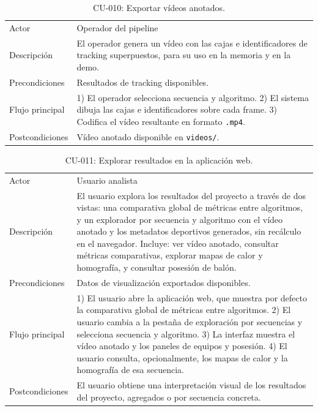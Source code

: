 \begin{table}[htp]
\centering
\caption{CU-010: Exportar vídeos anotados.}
\label{tab:cu-010}
\renewcommand{\arraystretch}{1.2}
\begin{tabular}{|p{3.1cm}|p{9.2cm}|}
\hline
\rowcolor{gray!25}
\multicolumn{2}{|l|}{\textbf{CU-010 -- Exportar vídeos anotados}} \\
\hline
Actor & Operador del pipeline \\
\hline
Descripción & El operador genera un vídeo con las cajas e identificadores
  de tracking superpuestos, para su uso en la memoria y en la demo. \\
\hline
Precondiciones & Resultados de tracking disponibles. \\
\hline
Flujo principal & 1) El operador selecciona secuencia y algoritmo. 2) El
  sistema dibuja las cajas e identificadores sobre cada frame. 3) Codifica
  el vídeo resultante en formato \texttt{.mp4}. \\
\hline
Postcondiciones & Vídeo anotado disponible en \texttt{videos/}. \\
\hline
\end{tabular}
\end{table}

\begin{table}[htp]
\centering
\caption{CU-011: Explorar resultados en la aplicación web.}
\label{tab:cu-011}
\renewcommand{\arraystretch}{1.2}
\begin{tabular}{|p{3.1cm}|p{9.2cm}|}
\hline
\rowcolor{gray!25}
\multicolumn{2}{|l|}{\textbf{CU-011 -- Explorar resultados en la aplicación web}} \\
\hline
Actor & Usuario analista \\
\hline
Descripción & El usuario explora los resultados del proyecto a través de
  dos vistas: una comparativa global de métricas entre algoritmos, y un
  explorador por secuencia y algoritmo con el vídeo anotado y los
  metadatos deportivos generados, sin recálculo en el navegador. Incluye:
  ver vídeo anotado, consultar métricas comparativas, explorar mapas de
  calor y homografía, y consultar posesión de balón. \\
\hline
Precondiciones & Datos de visualización exportados disponibles. \\
\hline
Flujo principal & 1) El usuario abre la aplicación web, que muestra por
  defecto la comparativa global de métricas entre algoritmos. 2) El
  usuario cambia a la pestaña de exploración por secuencias y selecciona
  secuencia y algoritmo. 3) La interfaz muestra el vídeo anotado y los
  paneles de equipos y posesión. 4) El usuario consulta, opcionalmente,
  los mapas de calor y la homografía de esa secuencia. \\
\hline
Postcondiciones & El usuario obtiene una interpretación visual de los
  resultados del proyecto, agregados o por secuencia concreta. \\
\hline
\end{tabular}
\end{table}

